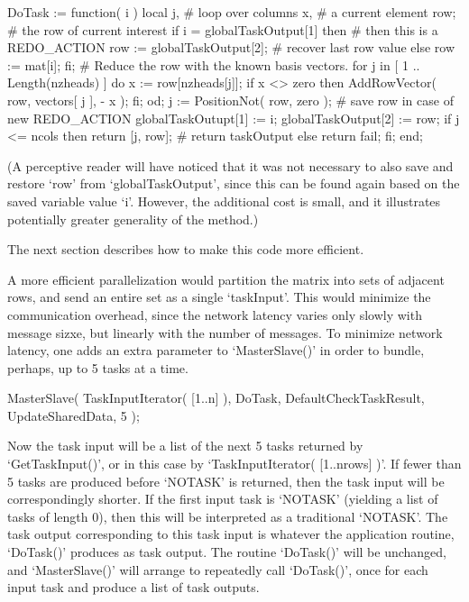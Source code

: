 \beginexample
  DoTask := function( i )
      local j,         # loop over columns
            x,         # a current element
            row;       # the row of current interest
    if i = globalTaskOutput[1] then
      # then this is a REDO_ACTION
      row := globalTaskOutput[2]; # recover last row value
    else row := mat[i];
    fi;
    # Reduce the row with the known basis vectors.
    for j in [ 1 .. Length(nzheads) ] do
      x := row[nzheads[j]];
      if x <> zero then
        AddRowVector( row, vectors[ j ], - x );
      fi;
    od;
    j := PositionNot( row, zero );
    # save row in case of new REDO_ACTION
    globalTaskOutupt[1] := i;
    globalTaskOutput[2] := row;
    if j <= ncols then return [j, row]; # return taskOutput
    else return fail; fi;
  end;
\endexample

(A perceptive reader will have noticed that it was not necessary to
also save and restore `row' from `globalTaskOutput', since this can
be found again based on the saved variable value `i'.  However, the
additional cost is small, and it illustrates potentially greater
generality of the method.)

The next section describes how to make this code more efficient.


A more efficient parallelization would partition the matrix into sets
of adjacent rows, and send an entire set as a single `taskInput'.
This would minimize the communication overhead, since the network latency
varies only slowly with message sizxe, but linearly with the number
of messages.  To minimize network latency, one adds an extra parameter
to `MasterSlave()' in order to bundle, perhaps, up to 5 tasks at a time.

\beginexample
MasterSlave( TaskInputIterator( [1..n] ), DoTask, DefaultCheckTaskResult,
             UpdateSharedData, 5 );
\endexample

Now the task input will be a list of the next 5 tasks returned by
`GetTaskInput()', or in this case by `TaskInputIterator( [1..nrows] )'.
If fewer than 5 tasks are produced before `NOTASK' is returned, then
the task input will be correspondingly shorter.  If the first input
task is `NOTASK' (yielding a list of tasks of length 0), then this
will be interpreted as a traditional `NOTASK'.  The task output
corresponding to this task input is whatever the application routine,
`DoTask()' produces as task output.  The routine `DoTask()' will be
unchanged, and `MasterSlave()' will arrange to repeatedly call
`DoTask()', once for each input task and produce a list of task
outputs.

